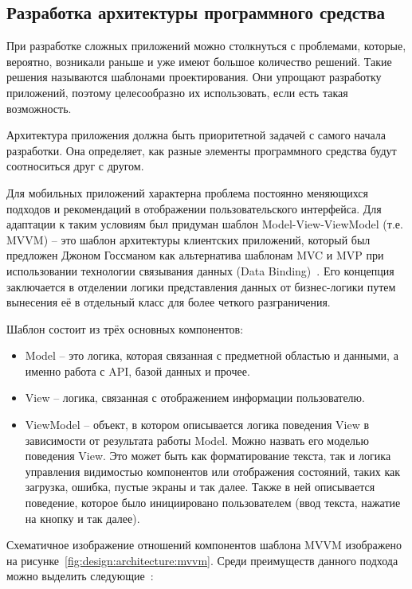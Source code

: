 \subsection{Разработка архитектуры программного средства}
\label{sec:design:architecture}

При разработке сложных приложений можно столкнуться с проблемами, которые, вероятно, возникали раньше и уже имеют большое количество решений.
Такие решения называются шаблонами проектирования.
Они упрощают разработку приложений, поэтому целесообразно их использовать, если есть такая возможность.

Архитектура приложения должна быть приоритетной задачей с самого начала разработки.
Она определяет, как разные элементы программного средства будут соотноситься друг с другом.

Для мобильных приложений характерна проблема постоянно меняющихся подходов и рекомендаций в отображении пользовательского интерфейса.
Для адаптации к таким условиям был придуман шаблон Model-View-ViewModel (т.е. MVVM) -- это шаблон архитектуры клиентских приложений, который был предложен Джоном Госсманом как альтернатива шаблонам MVC и MVP при использовании технологии связывания данных (Data Binding)~\cite{microsoft_mvvm}.
Его концепция заключается в отделении логики представления данных от бизнес-логики путем вынесения её в отдельный класс для более четкого разграничения.

Шаблон состоит из трёх основных компонентов:
\begin{itemize}
    \item Model -- это логика, которая связанная с предметной областью и данными, а именно работа с API, базой данных и прочее.
    \item View -- логика, связанная с отображением информации пользователю.
    \item ViewModel -- объект, в котором описывается логика поведения View в зависимости от результата работы Model.
    Можно назвать его моделью поведения View.
    Это может быть как форматирование текста, так и логика управления видимостью компонентов или отображения состояний, таких как загрузка, ошибка, пустые экраны и так далее.
    Также в ней описывается поведение, которое было инициировано пользователем (ввод текста, нажатие на кнопку и так далее).
\end{itemize}

Схематичное изображение отношений компонентов шаблона MVVM изображено на рисунке~\ref{fig:design:architecture:mvvm}.
Среди преимуществ данного подхода можно выделить следующие~\cite{android_mvvm}:

